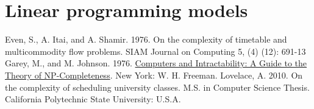 \documentclass[]{article}
\theoremstyle{definition}
\theoremstyle{remark}
\numberwithin{equation}{section}
\begin{document}
\section{Linear programming models}

\begin{thebibliography}{9}
  Even, S., A. Itai, and A. Shamir. 1976. On the complexity of timetable and multicommodity flow problems. SIAM Journal on Computing 5, (4) (12): 691-13
  Garey, M., and M. Johnson. 1976. \underline{Computers and Intractability: A Guide to the Theory of NP-Completeness}. New York: W. H. Freeman.
  Lovelace, A. 2010. On the complexity of scheduling university classes. M.S. in Computer Science Thesis. California Polytechnic State University: U.S.A.	

\end{thebibliography}
\end{document}
